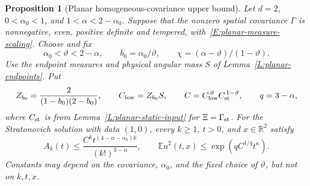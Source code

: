 \documentclass[12pt]{article}
\numberwithin{equation}{section}
\newtheorem{proposition}[theorem]{Proposition}
\theoremstyle{definition}
\newcommand{\R}{\mathbb{R}}
\newcommand{\E}{\mathbb{E}}
\begin{document}
\begin{proposition}[Planar homogeneous-covariance upper bound]
  \label{P:planar-upper}
  Let $d=2$, $0<\alpha_0<1$, and $1<\alpha<2-\alpha_0$.
  Suppose that the nonzero spatial covariance $\Gamma$ is nonnegative,
  even, positive definite and tempered,
  with~\eqref{E:planar-measure-scaling}. Choose and fix
  \[
    \alpha_0<\vartheta<2-\alpha,\qquad
    b_0=\alpha_0/\vartheta,\qquad
    \chi=(\alpha-\vartheta)/(1-\vartheta).
  \]
  Use the endpoint measures and physical angular mass $S$ of
  Lemma~\ref{L:planar-endpoints}. Put
  \[
    Z_{b_0}=\frac2{(1-b_0)(2-b_0)},\qquad
    C_{\rm low}=Z_{b_0}S,\qquad
    C=C_{\rm low}^{\,\vartheta}C_{\rm st}^{\,1-\vartheta},
    \qquad q=3-\alpha,
  \]
  where $C_{\rm st}$ is from Lemma~\ref{L:planar-static-input} for
  $\Xi=\Gamma_{\rm st}$. For the Stratonovich solution with data
  $(1,0)$, every $k\ge1$, $t>0$, and $x\in\R^2$ satisfy
  \begin{equation}\label{E:planar-upper}
    A_k(t)\le\frac{C^kt^{(4-\alpha-\alpha_0)k}}{(k!)^{3-\alpha}},
    \qquad
    \E u^2(t,x)\le\exp\left(qC^{1/q}t^\kappa\right).
  \end{equation}
  Constants may depend on the covariance, $\alpha_0$, and the fixed
  choice of $\vartheta$, but not on $k,t,x$.
\end{proposition}
\end{document}
